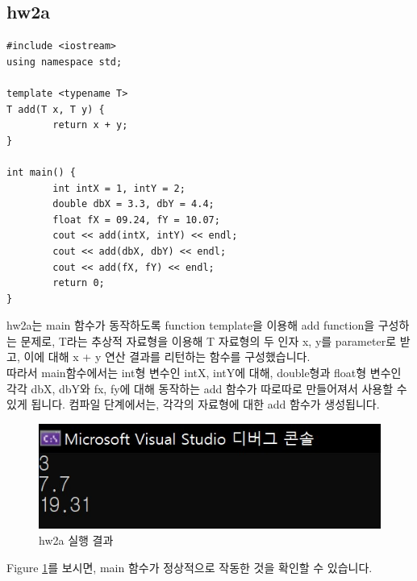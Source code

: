 \documentclass{article}
\begin{document}
\subsection{hw2a}
\begin{verbatim}
#include <iostream>
using namespace std;

template <typename T>
T add(T x, T y) {
    	return x + y;
}

int main() {
    	int intX = 1, intY = 2;
    	double dbX = 3.3, dbY = 4.4;
    	float fX = 09.24, fY = 10.07;
    	cout << add(intX, intY) << endl;
    	cout << add(dbX, dbY) << endl;
    	cout << add(fX, fY) << endl;
    	return 0;
}
\end{verbatim}
hw2a는 main 함수가 동작하도록 function template을 이용해 add function을 구성하는 문제로, T라는 추상적 자료형을 이용해 T 자료형의 두 인자 x, y를 parameter로 받고, 이에 대해 x + y 연산 결과를 리턴하는 함수를 구성했습니다.\\
따라서 main함수에서는 int형 변수인 intX, intY에 대해, double형과 float형 변수인 각각 dbX, dbY와 fx, fy에 대해 동작하는 add 함수가 따로따로 만들어져서 사용할 수 있게 됩니다. 컴파일 단계에서는, 각각의 자료형에 대한 add 함수가 생성됩니다.
\begin{figure} [h]
    \centering
    \includegraphics{hw2a result.jpg}
    \caption{hw2a 실행 결과}
    \label{fig:hw2a result}
\end{figure}
Figure \ref{fig:hw2a result}를 보시면, main 함수가 정상적으로 작동한 것을 확인할 수 있습니다. 
\end{document}
